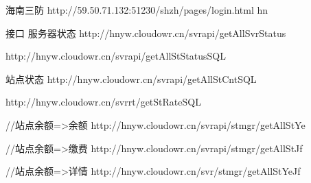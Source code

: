 海南三防
http://59.50.71.132:51230/shzh/pages/login.html   hn

接口
服务器状态
http://hnyw.cloudowr.cn/svrapi/getAllSvrStatus


http://hnyw.cloudowr.cn/svrapi/getAllStStatusSQL

站点状态
http://hnyw.cloudowr.cn/svrapi/getAllStCntSQL


http://hnyw.cloudowr.cn/svrrt/getStRateSQL

//站点余额=>余额
http://hnyw.cloudowr.cn/svrapi/stmgr/getAllStYe

//站点余额=>缴费
http://hnyw.cloudowr.cn/svrapi/stmgr/getAllStJf

//站点余额=>详情
http://hnyw.cloudowr.cn/svr/stmgr/getAllStYeJf